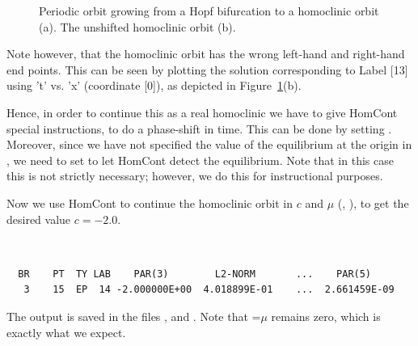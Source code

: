 \begin{figure}[htb]
\begin{center}
\begin{picture}
\end{picture}
\caption{Periodic orbit growing from a Hopf bifurcation to a
  homoclinic orbit (a). The unshifted homoclinic orbit (b).}
\label{hopfbif}
\end{center}
\end{figure}

Note however, that the homoclinic orbit has the wrong left-hand and
right-hand end points. This can be seen by plotting the solution
corresponding to Label [13] using 't' vs. 'x' (coordinate [0]), 
as depicted in Figure~\ref{hopfbif}(b).

Hence, in order to continue this as a real homoclinic 
we have to give {\cal HomCont} special instructions, to do a phase-shift in
time. This can be done by setting . Moreover, 
since we have not specified the value of
the equilibrium at the origin in , 
we need to set  to let
{\cal HomCont} detect the equilibrium. Note that in this case this is not
strictly necessary; however, we do this for instructional purposes.

Now we use {\cal HomCont} to continue the homoclinic orbit in $c$ and $\mu$ 
(, ), to get the desired value $c=-2.0$.
\begin{center}
 \\
\end{center}
\begin{verbatim}
  BR    PT  TY LAB    PAR(3)        L2-NORM       ...    PAR(5)     
   3    15  EP  14 -2.000000E+00  4.018899E-01    ...  2.661459E-09
\end{verbatim}
The output is saved in the files ,  and
. Note that =$\mu$ remains zero, which is exactly
what we expect.

